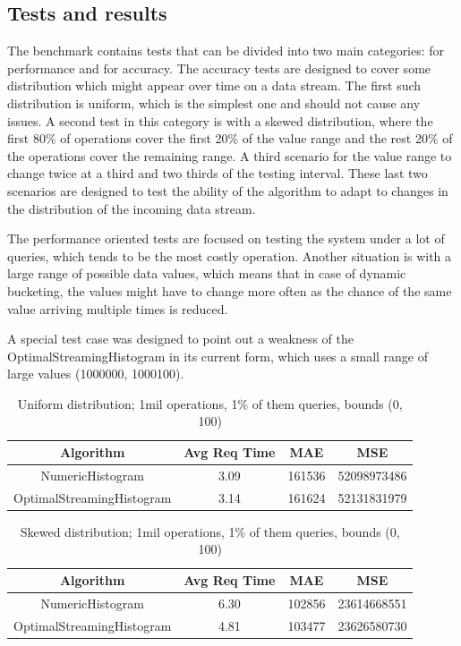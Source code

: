 \documentclass[12pt]{article}
\begin{document}
	\subsection{Tests and results}
	The benchmark contains tests that can be divided into two main categories:
	for performance and for accuracy. The accuracy tests are designed to cover 
	some distribution which might appear over time on a data stream. The first 
	such distribution is uniform, which 
	is the simplest one and should not cause any issues. A second test in this 
	category is with a skewed distribution, where the first 80\% of operations 
	cover the first 20\% of the value range and the rest 20\% of the operations 
	cover the remaining range. A third scenario for the value range to change 
	twice at a third and two thirds of the testing interval. These last two scenarios 
	are designed to test the ability of the algorithm to adapt to changes in 
	the distribution of the incoming data stream.

	The performance oriented tests are focused on testing the system under 
	a lot of queries, which tends to be the most costly operation. Another 
	situation is with a large range of possible data values, which means 
	that in case of dynamic bucketing, the values might have to change 
	more often as the chance of the same value arriving multiple times is 
	reduced.

	A special test case was designed to point out a weakness of the 
	OptimalStreamingHistogram in its current form, which uses a small 
	range of large values (1000000, 1000100).

	\begin{table}[h!]
		\begin{center}
		  \caption{Uniform distribution; 1mil operations, 1\% of them queries, bounds (0, 100)}
		  \label{tab:uniform}
		  \begin{tabular}{c|c|c|c}
			\textbf{Algorithm} & \textbf{Avg Req Time} & \textbf{MAE} & \textbf{MSE}\\
			\hline
			NumericHistogram & 3.09 & 161536 & 52098973486 \\
			OptimalStreamingHistogram & 3.14 & 161624 & 52131831979 \\			
		  \end{tabular}
	    \end{center}
    \end{table}


	\begin{table}[h!]
		\begin{center}
			\caption{Skewed distribution; 1mil operations, 1\% of them queries, bounds (0, 100)}
			\label{tab:uniform}
			\begin{tabular}{c|c|c|c} 
				\textbf{Algorithm} & \textbf{Avg Req Time} & \textbf{MAE} & \textbf{MSE}\\
				\hline
				NumericHistogram & 6.30 & 102856 & 23614668551 \\
				OptimalStreamingHistogram & 4.81 & 103477 & 23626580730 \\
			\end{tabular}
		\end{center}
	\end{table}
			
\end{document}

